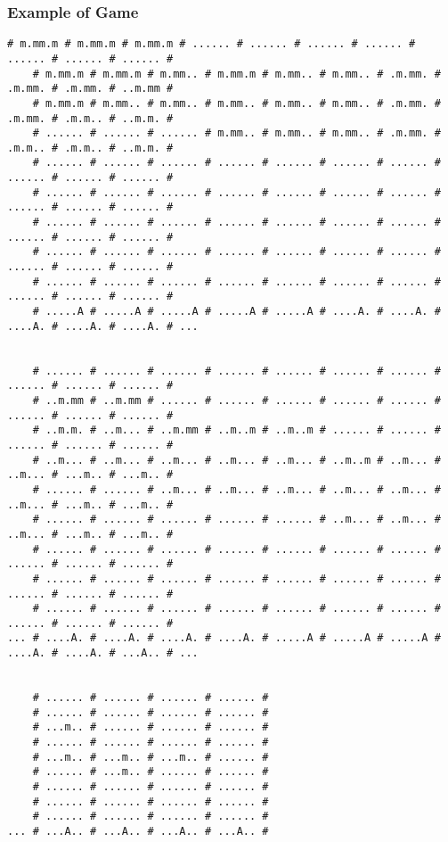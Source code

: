 \documentclass[a4paper]{article}
\begin{document}
\subsubsection{Example of Game}
\begin{Verbatim}[fontsize=\footnotesize]
    # m.mm.m # m.mm.m # m.mm.m # ...... # ...... # ...... # ...... # ...... # ...... # ...... #
    # m.mm.m # m.mm.m # m.mm.. # m.mm.m # m.mm.. # m.mm.. # .m.mm. # .m.mm. # .m.mm. # ..m.mm #
    # m.mm.m # m.mm.. # m.mm.. # m.mm.. # m.mm.. # m.mm.. # .m.mm. # .m.mm. # .m.m.. # ..m.m. #
    # ...... # ...... # ...... # m.mm.. # m.mm.. # m.mm.. # .m.mm. # .m.m.. # .m.m.. # ..m.m. #
    # ...... # ...... # ...... # ...... # ...... # ...... # ...... # ...... # ...... # ...... #
    # ...... # ...... # ...... # ...... # ...... # ...... # ...... # ...... # ...... # ...... #
    # ...... # ...... # ...... # ...... # ...... # ...... # ...... # ...... # ...... # ...... #
    # ...... # ...... # ...... # ...... # ...... # ...... # ...... # ...... # ...... # ...... #
    # ...... # ...... # ...... # ...... # ...... # ...... # ...... # ...... # ...... # ...... #
    # .....A # .....A # .....A # .....A # .....A # ....A. # ....A. # ....A. # ....A. # ....A. # ...


    # ...... # ...... # ...... # ...... # ...... # ...... # ...... # ...... # ...... # ...... #
    # ..m.mm # ..m.mm # ...... # ...... # ...... # ...... # ...... # ...... # ...... # ...... #
    # ..m.m. # ..m... # ..m.mm # ..m..m # ..m..m # ...... # ...... # ...... # ...... # ...... #
    # ..m... # ..m... # ..m... # ..m... # ..m... # ..m..m # ..m... # ..m... # ...m.. # ...m.. #
    # ...... # ...... # ..m... # ..m... # ..m... # ..m... # ..m... # ..m... # ...m.. # ...m.. #
    # ...... # ...... # ...... # ...... # ...... # ..m... # ..m... # ..m... # ...m.. # ...m.. #
    # ...... # ...... # ...... # ...... # ...... # ...... # ...... # ...... # ...... # ...... #
    # ...... # ...... # ...... # ...... # ...... # ...... # ...... # ...... # ...... # ...... #
    # ...... # ...... # ...... # ...... # ...... # ...... # ...... # ...... # ...... # ...... #
... # ....A. # ....A. # ....A. # ....A. # .....A # .....A # .....A # ....A. # ....A. # ...A.. # ...


    # ...... # ...... # ...... # ...... #
    # ...... # ...... # ...... # ...... #
    # ...m.. # ...... # ...... # ...... #
    # ...... # ...... # ...... # ...... #
    # ...m.. # ...m.. # ...m.. # ...... #
    # ...... # ...m.. # ...... # ...... #
    # ...... # ...... # ...... # ...... #
    # ...... # ...... # ...... # ...... #
    # ...... # ...... # ...... # ...... #
... # ...A.. # ...A.. # ...A.. # ...A.. #
\end{Verbatim}
\end{document}
